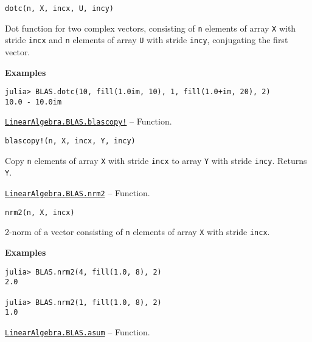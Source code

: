 \begin{adjustwidth}{2em}{0pt}


\begin{verbatim}
dotc(n, X, incx, U, incy)
\end{verbatim}

Dot function for two complex vectors, consisting of \texttt{n} elements of array \texttt{X} with stride \texttt{incx} and \texttt{n} elements of array \texttt{U} with stride \texttt{incy}, conjugating the first vector.

\textbf{Examples}


\begin{verbatim}
julia> BLAS.dotc(10, fill(1.0im, 10), 1, fill(1.0+im, 20), 2)
10.0 - 10.0im
\end{verbatim}



\end{adjustwidth}
\hypertarget{18067085143510999712}{}
\hyperlink{18067085143510999712}{\texttt{LinearAlgebra.BLAS.blascopy!}}  -- {Function.}

\begin{adjustwidth}{2em}{0pt}


\begin{verbatim}
blascopy!(n, X, incx, Y, incy)
\end{verbatim}

Copy \texttt{n} elements of array \texttt{X} with stride \texttt{incx} to array \texttt{Y} with stride \texttt{incy}. Returns \texttt{Y}.



\end{adjustwidth}
\hypertarget{16054338457942758080}{}
\hyperlink{16054338457942758080}{\texttt{LinearAlgebra.BLAS.nrm2}}  -- {Function.}

\begin{adjustwidth}{2em}{0pt}


\begin{verbatim}
nrm2(n, X, incx)
\end{verbatim}

2-norm of a vector consisting of \texttt{n} elements of array \texttt{X} with stride \texttt{incx}.

\textbf{Examples}


\begin{verbatim}
julia> BLAS.nrm2(4, fill(1.0, 8), 2)
2.0

julia> BLAS.nrm2(1, fill(1.0, 8), 2)
1.0
\end{verbatim}



\end{adjustwidth}
\hypertarget{17921796148467908168}{}
\hyperlink{17921796148467908168}{\texttt{LinearAlgebra.BLAS.asum}}  -- {Function.}

